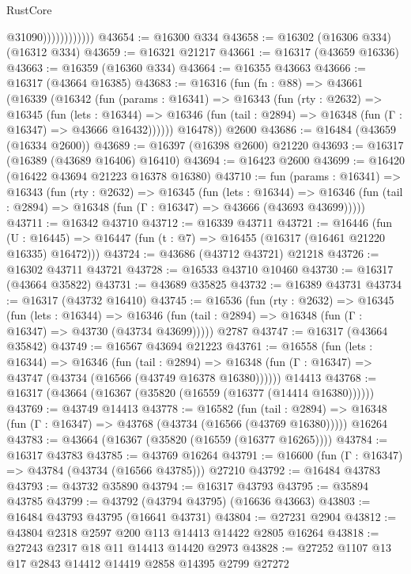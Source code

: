 \begin{lexlean}{RustCore}
\begin{coremodule}
                            @31090))))))))))))
@43654 := @16300 @334
@43658 := @16302 (@16306 @334) (@16312 @334)
@43659 := @16321 @21217
@43661 := @16317 (@43659 @16336)
@43663 := @16359 (@16360 @334)
@43664 := @16355 @43663
@43666 := @16317 (@43664 @16385)
@43683 := @16316
    (fun (fn : @88) =>
    @43661
      (@16339
        (@16342
          (fun (params : @16341) =>
          @16343
            (fun (rty : @2632) =>
            @16345
              (fun (lets : @16344) =>
              @16346 (fun (tail : @2894) => @16348 (fun (Γ : @16347) => @43666 @16432))))))
        @16478))
    @2600
@43686 := @16484 (@43659 (@16334 @2600))
@43689 := @16397 (@16398 @2600) @21220
@43693 := @16317 (@16389 (@43689 @16406) @16410)
@43694 := @16423 @2600
@43699 := @16420 (@16422 @43694 @21223 @16378 @16380)
@43710 := fun (params : @16341) =>
  @16343
    (fun (rty : @2632) =>
    @16345
      (fun (lets : @16344) =>
      @16346 (fun (tail : @2894) => @16348 (fun (Γ : @16347) => @43666 (@43693 @43699)))))
@43711 := @16342 @43710
@43712 := @16339 @43711
@43721 := @16446
    (fun (U : @16445) => @16447 (fun (t : @7) => @16455 (@16317 (@16461 @21220 @16335) @16472)))
@43724 := @43686 (@43712 @43721) @21218
@43726 := @16302 @43711 @43721
@43728 := @16533 @43710 @10460
@43730 := @16317 (@43664 @35822)
@43731 := @43689 @35825
@43732 := @16389 @43731
@43734 := @16317 (@43732 @16410)
@43745 := @16536
    (fun (rty : @2632) =>
    @16345
      (fun (lets : @16344) =>
      @16346 (fun (tail : @2894) => @16348 (fun (Γ : @16347) => @43730 (@43734 @43699)))))
    @2787
@43747 := @16317 (@43664 @35842)
@43749 := @16567 @43694 @21223
@43761 := @16558
    (fun (lets : @16344) =>
    @16346
      (fun (tail : @2894) =>
      @16348 (fun (Γ : @16347) => @43747 (@43734 (@16566 (@43749 @16378 @16380))))))
    @14413
@43768 := @16317 (@43664 (@16367 (@35820 (@16559 (@16377 (@14414 @16380))))))
@43769 := @43749 @14413
@43778 := @16582
    (fun (tail : @2894) => @16348 (fun (Γ : @16347) => @43768 (@43734 (@16566 (@43769 @16380)))))
    @16264
@43783 := @43664 (@16367 (@35820 (@16559 (@16377 @16265))))
@43784 := @16317 @43783
@43785 := @43769 @16264
@43791 := @16600 (fun (Γ : @16347) => @43784 (@43734 (@16566 @43785))) @27210
@43792 := @16484 @43783
@43793 := @43732 @35890
@43794 := @16317 @43793
@43795 := @35894 @43785
@43799 := @43792 (@43794 @43795) (@16636 @43663)
@43803 := @16484 @43793 @43795 (@16641 @43731)
@43804 := @27231 @2904
@43812 := @43804 @2318 @2597 @200 @113 @14413 @14422 @2805 @16264
@43818 := @27243 @2317 @18 @11 @14413 @14420 @2973
@43828 := @27252 @1107 @13 @17 @2843 @14412 @14419 @2858 @14395 @2799 @27272

\end{coremodule}
\end{lexlean}
